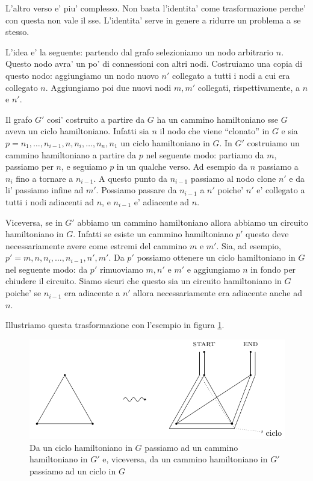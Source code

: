 L'altro verso e' piu' complesso. Non basta l'identita' come trasformazione perche' con questa non
vale il sse. L'identita' serve in genere a ridurre un problema a se stesso.

L'idea e' la seguente: partendo dal grafo selezioniamo un nodo arbitrario $n$. Questo nodo avra' un
po' di connessioni con altri nodi. Costruiamo una copia di questo nodo: aggiungiamo un nodo nuovo
$n'$ collegato a tutti i nodi a cui era collegato $n$. Aggiungiamo poi due nuovi nodi $m,m'$
collegati, rispettivamente, a $n$ e $n'$.

Il grafo $G'$ cosi' costruito a partire da $G$ ha un cammino hamiltoniano sse $G$ aveva un ciclo
hamiltoniano. Infatti sia $n$ il nodo che viene ``clonato'' in $G$ e sia $p = n_{1}, \dotsc,
n_{i-1}, n, n_{i}, \dotsc, n_{n}, n_{1}$ un ciclo hamiltoniano in $G$. In $G'$ costruiamo un cammino
hamiltoniano a partire da $p$ nel seguente modo: partiamo da $m$, passiamo per $n$, e seguiamo $p$
in un qualche verso. Ad esempio da $n$ passiamo a $n_{i}$ fino a tornare a $n_{i-1}$. A questo punto
da $n_{i-1}$ passiamo al nodo clone $n'$ e da li' passiamo infine ad $m'$. Possiamo passare da
$n_{i-1}$ a $n'$ poiche' $n'$ e' collegato a tutti i nodi adiacenti ad $n$, e $n_{i-1}$ e' adiacente
ad $n$.

Viceversa, se in $G'$ abbiamo un cammino hamiltoniano allora abbiamo un circuito hamiltoniano in
$G$. Infatti se esiste un cammino hamiltoniano $p'$ questo deve necessariamente avere come estremi
del cammino $m$ e $m'$. Sia, ad esempio, $p' = m, n, n_{i},\dotsc, n_{i-1}, n', m'$. Da $p'$
possiamo ottenere un ciclo hamiltoniano in $G$ nel seguente modo: da $p'$ rimuoviamo $m, n'$ e $m'$
e aggiungiamo $n$ in fondo per chiudere il circuito. Siamo sicuri che questo sia un circuito
hamiltoniano in $G$ poiche' se $n_{i-1}$ era adiacente a $n'$ allora necessariamente era adiacente
anche ad $n$.

Illustriamo questa trasformazione con l'esempio in figura \ref{img:HAMCYCLEPATH}.

\begin{figure}[h]
    \begin{center}
        \includegraphics{./img/nondeterminism/HAMCYCLEPATH.pdf}
        \caption{Da un ciclo hamiltoniano in $G$ passiamo ad un cammino hamiltoniano in $G'$ e,
        viceversa, da un cammino hamiltoniano in $G'$ passiamo ad un ciclo in $G$}
        \label{img:HAMCYCLEPATH}
    \end{center}
\end{figure}

